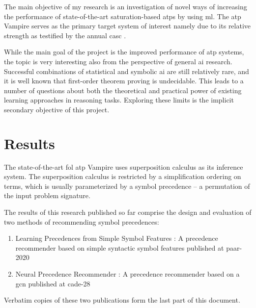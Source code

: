 \documentclass{article}
\begin{document}
The main objective of my research is an investigation of novel ways of increasing the performance of state-of-the-art saturation-based \glspl{atp} by using \gls{ml}.
The \gls{atp} Vampire \cite{DBLP:conf/cav/KovacsV13} serves as the primary target system of interest
namely due to its relative strength
as testified by the annual \gls{casc} \cite{Sut16}.

While the main goal of the project is the improved performance of \gls{atp} systems,
the topic is very interesting also from the perspective of general \gls{ai} research. Successful combinations of statistical and symbolic \gls{ai} are still relatively rare, and it is well known that first-order theorem proving is undecidable. This leads to a number of questions about both the theoretical and practical power of existing learning approaches in reasoning tasks. Exploring these limits is the implicit secondary objective of this project.

\section{Results}

The state-of-the-art \gls{fol} \gls{atp} Vampire uses superposition calculus as its inference system.
The superposition calculus is restricted by a simplification ordering on terms,
which is usually parameterized by a symbol precedence -- a permutation of the input problem signature.

The results of this research published so far
comprise the design and evaluation of two methods of recommending symbol precedences:

\begin{enumerate}
\item Learning Precedences from Simple Symbol Features \cite{DBLP:conf/cade/Bartek020}:
A precedence recommender based on simple syntactic symbol features published at \gls{paar-2020}
\item Neural Precedence Recommender \cite{DBLP:conf/cade/Bartek021}:
A precedence recommender based on a \gls{gcn} published at \gls{cade-28}
\end{enumerate}

Verbatim copies of these two publications form the last part of this document.

\end{document}

